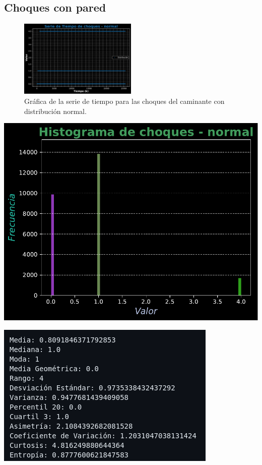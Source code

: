 \documentclass[11pt]{article} %
\begin{document}
	\subsection{Choques con pared}
	 \begin{figure}[h]
	 	\centering
	 	\includegraphics[width=0.5\textwidth]{graf_choques_normal.pdf}
	 	\caption{Gráfica de la serie de tiempo para las choques del caminante con distribución normal.}
	 	\label{fig:chNormalGraf}
	 \end{figure}
	 \begin{multicols}{2}
	 	\begin{minipage}{\linewidth}
	 		\centering
	 		\includegraphics[width=0.9\linewidth]{hist_choques_normal.pdf}
	 		\label{fig:chNormalHist}
	 	\end{minipage}
	 	\vfill\columnbreak
	 	\begin{minipage}{\linewidth}
	 		\centering
	 		\includegraphics[width=1\linewidth]{n4.png}%
	 		\label{chNormalMet}
	 	\end{minipage}
	 \end{multicols}
	 
\end{document}
